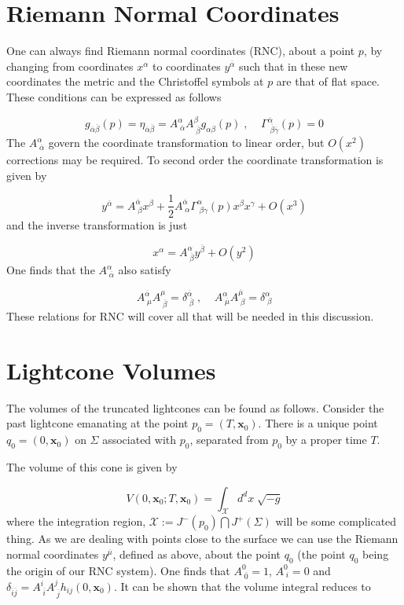 \documentclass[12pt]{article}
\newcommand{\be}{\begin{equation}}
\newcommand{\ee}{\end{equation}}
\begin{document}
\section{Riemann Normal Coordinates}

One can always find Riemann normal coordinates (RNC), about a point $p$, by changing from coordinates $x^{\alpha}$ to coordinates $y^{\overline{\alpha}}$ such that in these new coordinates the metric and the Christoffel symbols at $p$ are that of flat space. These conditions  can be expressed as follows

\be\label{eq:RNCMetricTransAtPAndChris}
g_{\overline{\alpha} \overline{\beta}}(p)=\eta_{\overline{\alpha} \overline{\beta}}=A^{\alpha}_{\;\overline{\alpha}}A^{\beta}_{\;\overline{\beta}}g_{\alpha\beta}(p)\;,\;\;\;\;\Gamma^{\overline{\alpha}}_{\;\overline{\beta}\overline{\gamma}}(p)=0
\ee
The $A^{\alpha}_{\;\overline{\alpha}}$ govern the coordinate transformation to linear order, but $O(x^2)$ corrections may be required. To second order the coordinate transformation is given by

\be\label{eq:RNCtotaltrans}
y^{\overline{\alpha}}=A^{\overline{\alpha}}_{\;\beta}x^\beta+\frac{1}{2}A^{\overline{\alpha}}_{\;\alpha}\Gamma^{\alpha}_{\;\beta\gamma}(p)x^\beta x^\gamma+O(x^3)
\ee
and the inverse transformation is just

\be\label{eq:RNCinversetrans}
x^{\alpha}=A^{\alpha}_{\;\overline{\beta}}y^{\overline{\beta}}+O(y^2)
\ee
One finds that the $A^{\alpha}_{\;\overline{\alpha}}$ also satisfy

\be\label{eq:RNCeqnforA}
A^{\overline{\alpha}}_{\;\mu}A^{\mu}_{\;\overline{\beta}}=\delta^{\overline{\alpha}}_{\;\overline{\beta}}\;,\;\;\;\;A^{\alpha}_{\;\overline{\mu}}A^{\overline{\mu}}_{\;\beta}=\delta^{\alpha}_{\;\beta}
\ee
These relations for RNC will cover all that will be needed in this discussion.

\section{Lightcone Volumes}

The volumes of the truncated lightcones can be found as follows. Consider the past lightcone emanating at the point $p_0=(T,\mathbf x_0)$. There is a unique point $q_0=(0,\mathbf x_0)$ on $\Sigma$ associated with $p_0$, separated from $p_0$ by a proper time $T$. 

The volume of this cone is given by

\be\label{eq:VolumeWithNoSimplifications}
V(0,\mathbf{x}_0;T,\mathbf{x}_0)=\int_{\mathcal{X}} d^d x\;\sqrt{-g}
\ee
where the integration region, $\mathcal{X}:= J^-(p_0)\bigcap J^+(\Sigma)$ will be some complicated thing. As we are dealing with points close to the surface we can use the  Riemann normal coordinates $y^{\overline{\mu}}$, defined as above, about the point $q_0$ (the point $q_0$ being the origin of our RNC system). One finds that $A^0_{\;\overline{0}}=1$, $A^0_{\;i}=0$ and $\delta_{\overline{i}\overline{j}}=A^i_{\;\overline{i}}A^j_{\;\overline{j}}h_{ij}(0,\mathbf{x}_0)$. It can be shown that the volume integral reduces to \cite{Khetrapal_Sumati:Causal_Diamond_Volume}
\end{document}
